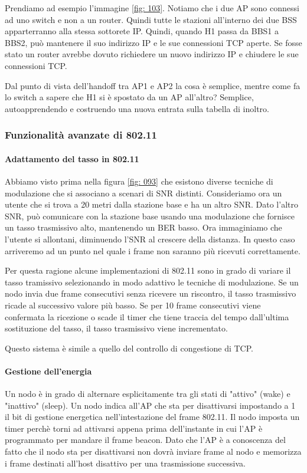 \documentclass[11pt,a4paper]{article}
\begin{document}
Prendiamo ad esempio l'immagine \ref{fig: 103}. Notiamo che i due AP sono connessi ad uno switch e non a un router. Quindi tutte le stazioni all'interno dei due BSS apparterranno alla stessa sottorete IP. Quindi, quando H1 passa da BBS1 a BBS2, può mantenere il suo indirizzo IP e le sue connessioni TCP aperte. Se fosse stato un router avrebbe dovuto richiedere un nuovo indirizzo IP e chiudere le sue connessioni TCP.

Dal punto di vista dell'handoff tra AP1 e AP2 la cosa è semplice, mentre come fa lo switch a sapere che H1 si è spostato da un AP all'altro? Semplice, autoapprendendo e costruendo una nuova entrata sulla tabella di inoltro.

\subsubsection{Funzionalità avanzate di 802.11}
\paragraph{Adattamento del tasso in 802.11}
Abbiamo visto prima nella figura  \ref{fig: 093} che esistono diverse tecniche di modulazione che si associano a scenari di SNR distinti. Consideriamo ora un utente che si trova a 20 metri dalla stazione base e ha un altro SNR. Dato l'altro SNR, può comunicare con la stazione base usando una modulazione che fornisce un tasso trasmissivo alto, mantenendo un BER basso. Ora immaginiamo che l'utente si allontani, diminuendo l'SNR al crescere della distanza. In questo caso arriveremo ad un punto nel quale i frame non saranno più ricevuti correttamente.

Per questa ragione alcune implementazioni di 802.11 sono in grado di variare il tasso tramissivo selezionando in modo adattivo le tecniche di modulazione. Se un nodo invia due frame consecutivi senza ricevere un riscontro, il tasso trasmissivo ricade al successivo valore più basso. Se per 10 frame consecutivi viene confermata la ricezione o scade il timer che tiene traccia del tempo dall'ultima sostituzione del tasso, il tasso trasmissivo viene incrementato.

Questo sistema è simile a quello del controllo di congestione di TCP.

\paragraph{Gestione dell'energia}
Un nodo è in grado di alternare esplicitamente tra gli stati di "attivo" (wake) e "inattivo" (sleep). Un nodo indica all'AP che sta per disattivarsi impostando a 1 il bit di gestione energetica nell'intestazione del frame 802.11. Il nodo imposta un timer perchè torni ad attivarsi appena prima dell'instante in cui l'AP è programmato per mandare il frame beacon. Dato che l'AP è a conoscenza del fatto che il nodo sta per disattivarsi non dovrà inviare frame al nodo e memorizza i frame destinati all'host disattivo per una trasmissione successiva.
\pagebreak
\end{document}
